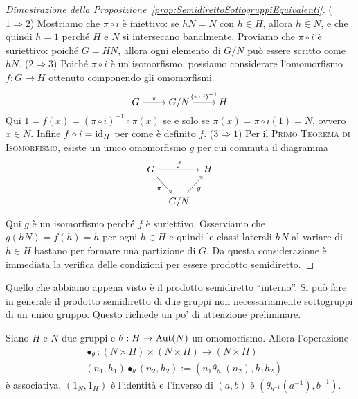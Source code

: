 \begin{proof}[Dimostrazione della Proposizione~\ref{prop:SemidirettoSottogruppiEquivalenti}]
($1 \Rightarrow 2$) Mostriamo che $\pi \circ i$ è iniettivo: se $h N = N$ con $h \in H$, allora $h \in N$, e che quindi $h = 1$ perché $H$ e $N$ si intersecano banalmente. Proviamo che $\pi \circ i$ è suriettivo: poiché $G = HN$, allora ogni elemento di $G/N$ può essere scritto come $h N$.\newline
($2 \Rightarrow 3$) Poiché $\pi \circ i$ è un isomorfismo, possiamo considerare l'omomorfismo $f : G \to H$ ottenuto componendo gli omomorfismi
\[\begin{tikzcd}[cramped] G \ar["\pi", r] & G/N \ar["{(\pi \circ i)^{-1}}", r] & H \end{tikzcd}\]
Qui $1 = f(x) = (\pi \circ i)^{-1} \circ \pi (x)$ se e solo se $\pi(x) = \pi \circ i (1) = N$, ovvero $x \in N$. Infine $f \circ i = \mathrm{id}_H$ per come è definito $f$.\newline
($3 \Rightarrow 1$) Per il {\scshape Primo Teorema di Isomorfismo}, esiste un unico omomorfismo $g$ per cui commuta il diagramma
\[\begin{tikzcd}[column sep=tiny]
G \ar["\pi", dr, swap] \ar["f", rr] & & H \\
& G/N \ar["g", ur, swap]
\end{tikzcd}\]
Qui $g$ è un isomorfismo perché $f$ è suriettivo. Osserviamo che $g(hN) = f(h) = h$ per ogni $h \in H$ e quindi le classi laterali $hN$ al variare di $h \in H$ bastano per formare una partizione di $G$. Da questa considerazione è immediata la verifica delle condizioni per essere prodotto semidiretto.
\end{proof}

Quello che abbiamo appena visto è il prodotto semidiretto \enquote{interno}. Si può fare in generale il prodotto semidiretto di due gruppi non necessariamente sottogruppi di un unico gruppo. Questo richiede un po' di attenzione preliminare.

\begin{lemm}
Siano $H$ e $N$ due gruppi e $\theta : H \to \mathrm{Aut}(N)$ un omomorfismo. Allora l'operazione
\begin{align*}
& \bullet_\theta : (N \times H) \times (N \times H) \to (N \times H) \\
& (n_1, h_1) \bullet_\theta (n_2, h_2) := (n_1 \theta_{h_1}(n_2), h_1 h_2)
\end{align*}
è associativa, $(1_N, 1_H)$ è l'identità e l'inverso di $(a, b)$ è $\left(\theta_{b^{-1}}\left(a^{-1}\right), b^{-1}\right)$.
\end{lemm}

